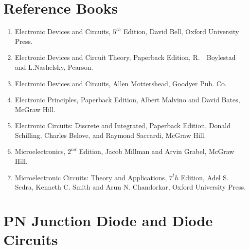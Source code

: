\documentclass[a5paper,10pt]{report}
\begin{document}
\chapter*{Reference Books}
\vspace*{-2.7cm}
\thispagestyle{empty}
\begin{enumerate}
    \item Electronic Devices and Circuits, $5^{th}$ Edition, David Bell, Oxford University Press.
    \item Electronic Devices and Circuit Theory, Paperback Edition,  R.  \,\, Boylestad and L.Nashelsky, Pearson.
    \item Electronic Devices and Circuits, Allen Mottershead, Goodyer Pub. Co.
    \item Electronic Principles, Paperback Edition, Albert Malvino and David Bates, McGraw Hill.
    \item Electronic Circuits: Discrete and Integrated, Paperback Edition, Donald Schilling, Charles Belove, and Raymond Saccardi, McGraw Hill.
    \item Microelectronics, $2^{nd}$ Edition, Jacob Millman and Arvin Grabel, McGraw Hill.
    \item Microelectronic Circuits: Theory and Applications, $7^th$ Edition, Adel S. Sedra, Kenneth C. Smith and Arun N. Chandorkar, Oxford University Press.
\end{enumerate}
\tableofcontents 
\thispagestyle{empty}
\newpage
\setcounter{page}{1}
\chapter{PN Junction Diode and Diode Circuits}
\end{document}
